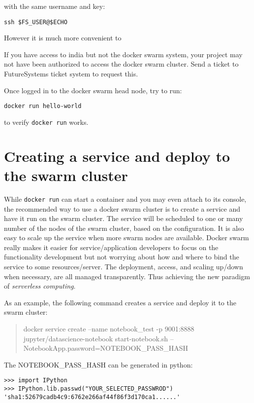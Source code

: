 with the same username and key:

\begin{lstlisting}
ssh $FS_USER@$ECHO
\end{lstlisting}

However it is much more convenient to 

\begin{NOTE}
If you have access to india but not the docker swarm
system, your project may not have been authorized to access the docker
swarm cluster. Send a ticket to FutureSystems ticket system to request
this.
\end{NOTE}

Once logged in to the docker swarm head node, try to run:

\begin{lstlisting}
docker run hello-world
\end{lstlisting}

to verify \verb|docker run| works.

\section{Creating a service and deploy to the swarm cluster}

While \verb|docker run| can start a container and you may even attach to its
console, the recommended way to use a docker swarm cluster is to create
a service and have it run on the swarm cluster. The service will be
scheduled to one or many number of the nodes of the swarm cluster, based
on the configuration. It is also easy to scale up the service when more
swarm nodes are available. Docker swarm really makes it easier for
service/application developers to focus on the functionality development
but not worrying about how and where to bind the service to some
resources/server. The deployment, access, and scaling up/down when
necessary, are all managed transparently. Thus achieving the new
paradigm of \textit{serverless computing}.

As an example, the following command creates a service and deploy it to
the swarm cluster:

\begin{quote}
docker service create --name notebook\_test -p 9001:8888
jupyter/datascience-notebook start-notebook.sh
--NotebookApp.password=NOTEBOOK\_PASS\_HASH
\end{quote}

The NOTEBOOK\_PASS\_HASH can be generated in python:

\begin{lstlisting}
>>> import IPython
>>> IPython.lib.passwd("YOUR_SELECTED_PASSWROD")
'sha1:52679cadb4c9:6762e266af44f86f3d170ca1......'
\end{lstlisting}

